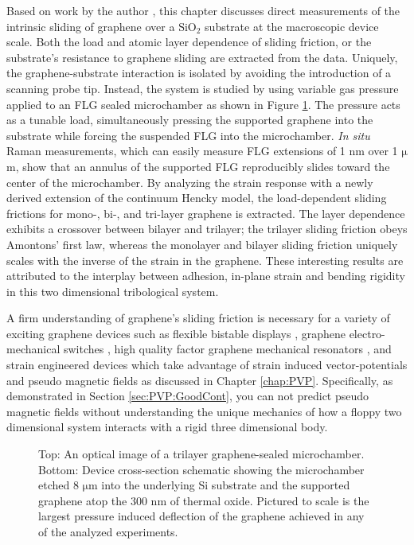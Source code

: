 Based on work by the author \cite{Kitt2013a}, this chapter discusses direct measurements of the intrinsic sliding of graphene over a $\mathrm{SiO_2}$ substrate at the macroscopic device scale.
Both the load and atomic layer dependence of sliding friction, or the substrate's resistance to graphene sliding are extracted from the data.
Uniquely, the graphene-substrate interaction is isolated by avoiding the introduction of a scanning probe tip.
Instead, the system is studied by using variable gas pressure applied to an FLG sealed microchamber as shown in Figure \ref{fig:fri:device}.
The pressure acts as a tunable load, simultaneously pressing the supported graphene into the substrate while forcing the suspended FLG into the microchamber.
\emph{In situ} Raman measurements, which can easily measure FLG extensions of 1 nm over 1 $\mathrm{\mu}$m, show that an annulus of the supported FLG reproducibly slides toward the center of the microchamber.
By analyzing the strain response with a newly derived extension of the continuum Hencky model, the load-dependent sliding frictions for mono-, bi-, and tri-layer graphene is extracted.
The layer dependence exhibits a crossover between bilayer and trilayer; the trilayer sliding friction obeys Amontons' first law, whereas the monolayer and bilayer sliding friction uniquely scales with the inverse of the strain in the graphene.
These interesting results are attributed to the interplay between adhesion, in-plane strain and bending rigidity in this two dimensional tribological system.

A firm understanding of graphene's sliding friction is necessary for a variety of exciting graphene devices such as flexible bistable displays \cite{Bonaccorso2010}, graphene electro-mechanical switches \cite{Milaninia2009}, high quality factor graphene mechanical resonators \cite{Kim2009b,Bunch2007,Chen2009,Barton2011}, and strain engineered devices \cite{Pereira2009a} which take advantage of strain induced vector-potentials and pseudo magnetic fields \cite{CastroNeto2009,Guinea2009,Kitt2012,Kitt2013} as discussed in Chapter \ref{chap:PVP}.
Specifically, as demonstrated in Section \ref{sec:PVP:GoodCont}, you can not predict pseudo magnetic fields without understanding the unique mechanics of how a floppy two dimensional system interacts with a rigid three dimensional body.

\begin{figure}
	\begin{center}
	
	\end{center}
	\caption[Schematic of devices used to measure graphene's sliding]{\label{fig:fri:device} Top: An optical image of a trilayer graphene-sealed microchamber. Bottom: Device cross-section schematic showing the microchamber etched 8 $\mathrm{\mu}$m into the underlying Si substrate and the supported graphene atop the 300 nm of thermal oxide.  Pictured to scale is the largest pressure induced deflection of the graphene achieved in any of the analyzed experiments.}
\end{figure}

